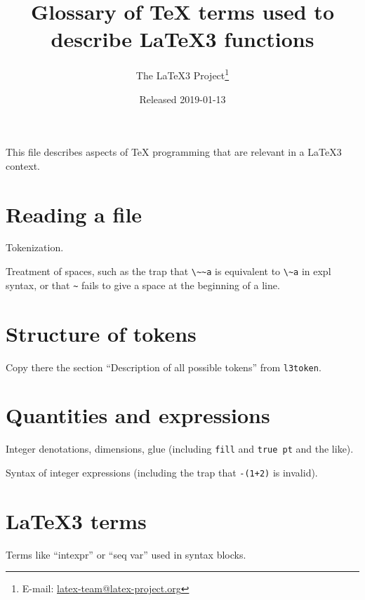 \documentclass{l3doc}
\title{%
  Glossary of \TeX{} terms used to describe \LaTeX3 functions%
}
\author{%
  The \LaTeX3 Project\thanks
    {%
      E-mail:
      \href{mailto:latex-team@latex-project.org}%
        {latex-team@latex-project.org}%
    }%
}
\date{Released 2019-01-13}
\begin{document}
\maketitle

This file describes aspects of \TeX{} programming that are relevant in a
\LaTeX3 context.

\section{Reading a file}

Tokenization.

Treatment of spaces, such as the trap that \verb|\~~a| is equivalent to
\verb|\~a| in expl syntax, or that \verb|~| fails to give a space at the
beginning of a line.

\section{Structure of tokens}

Copy there the section ``Description of all possible tokens'' from \texttt{l3token}.

\section{Quantities and expressions}

Integer denotations, dimensions, glue (including \texttt{fill} and \texttt{true pt} and the like).

Syntax of integer expressions (including the trap that \verb|-(1+2)| is invalid).

\section{\LaTeX3 terms}

Terms like ``intexpr'' or ``seq var'' used in syntax blocks.
\end{document}
